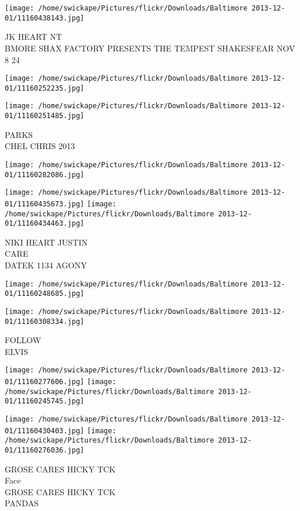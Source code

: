 \documentclass[10pt,letterpaper]{article}
\begin{document}
\vspace{0.25in}
\texttt{[image: /home/swickape/Pictures/flickr/Downloads/Baltimore 2013-12-01/11160438143.jpg]}

JK HEART NT\\
BMORE SHAX FACTORY PRESENTS THE TEMPEST SHAKESFEAR NOV 8 24
\pagebreak

\texttt{[image: /home/swickape/Pictures/flickr/Downloads/Baltimore 2013-12-01/11160252235.jpg]}

\vspace{0.25in}
\texttt{[image: /home/swickape/Pictures/flickr/Downloads/Baltimore 2013-12-01/11160251485.jpg]}

PARKS\\
CHEL CHRIS 2013
\pagebreak

\texttt{[image: /home/swickape/Pictures/flickr/Downloads/Baltimore 2013-12-01/11160282086.jpg]}

\vspace{0.25in}
\texttt{[image: /home/swickape/Pictures/flickr/Downloads/Baltimore 2013-12-01/11160435673.jpg]}
\texttt{[image: /home/swickape/Pictures/flickr/Downloads/Baltimore 2013-12-01/11160434463.jpg]}

NIKI HEART JUSTIN\\
CARE\\
DATEK 1134 AGONY
\pagebreak

\texttt{[image: /home/swickape/Pictures/flickr/Downloads/Baltimore 2013-12-01/11160248685.jpg]}

\vspace{0.25in}
\texttt{[image: /home/swickape/Pictures/flickr/Downloads/Baltimore 2013-12-01/11160308334.jpg]}

FOLLOW\\
ELVIS
\pagebreak

\texttt{[image: /home/swickape/Pictures/flickr/Downloads/Baltimore 2013-12-01/11160277606.jpg]}
\texttt{[image: /home/swickape/Pictures/flickr/Downloads/Baltimore 2013-12-01/11160245745.jpg]}

\texttt{[image: /home/swickape/Pictures/flickr/Downloads/Baltimore 2013-12-01/11160430403.jpg]}
\texttt{[image: /home/swickape/Pictures/flickr/Downloads/Baltimore 2013-12-01/11160276036.jpg]}

GROSE CARES HICKY TCK\\
Face\\
GROSE CARES HICKY TCK\\
PANDAS
\pagebreak
\end{document}
